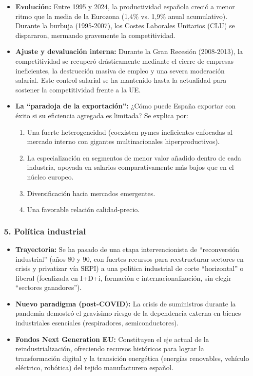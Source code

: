 \begin{itemize}
  \item \textbf{Evolución:} Entre 1995 y 2024, la productividad española creció a menor ritmo que la media de la Eurozona (1,4\% vs. 1,9\% anual acumulativo). Durante la burbuja (1995-2007), los Costes Laborales Unitarios (CLU) se dispararon, mermando gravemente la competitividad.
  \item \textbf{Ajuste y devaluación interna:} Durante la Gran Recesión (2008-2013), la competitividad se recuperó drásticamente mediante el cierre de empresas ineficientes, la destrucción masiva de empleo y una severa moderación salarial. Este control salarial se ha mantenido hasta la actualidad para sostener la competitividad frente a la UE.
  \item \textbf{La ``paradoja de la exportación'':} ¿Cómo puede España exportar con éxito si su eficiencia agregada es limitada? Se explica por:
    \begin{enumerate}
      \item Una fuerte heterogeneidad (coexisten pymes ineficientes enfocadas al mercado interno con gigantes multinacionales hiperproductivos).
      \item La especialización en segmentos de menor valor añadido dentro de cada industria, apoyada en salarios comparativamente más bajos que en el núcleo europeo.
      \item Diversificación hacia mercados emergentes.
      \item Una favorable relación calidad-precio.
    \end{enumerate}
\end{itemize}

\subsubsection*{5. Política industrial}

\begin{itemize}
  \item \textbf{Trayectoria:} Se ha pasado de una etapa intervencionista de ``reconversión industrial'' (años 80 y 90, con fuertes recursos para reestructurar sectores en crisis y privatizar vía SEPI) a una política industrial de corte ``horizontal'' o liberal (focalizada en I+D+i, formación e internacionalización, sin elegir ``sectores ganadores'').
  \item \textbf{Nuevo paradigma (post-COVID):} La crisis de suministros durante la pandemia demostró el gravísimo riesgo de la dependencia externa en bienes industriales esenciales (respiradores, semiconductores).
  \item \textbf{Fondos Next Generation EU:} Constituyen el eje actual de la reindustrialización, ofreciendo recursos históricos para lograr la transformación digital y la transición energética (energías renovables, vehículo eléctrico, robótica) del tejido manufacturero español.
\end{itemize}

